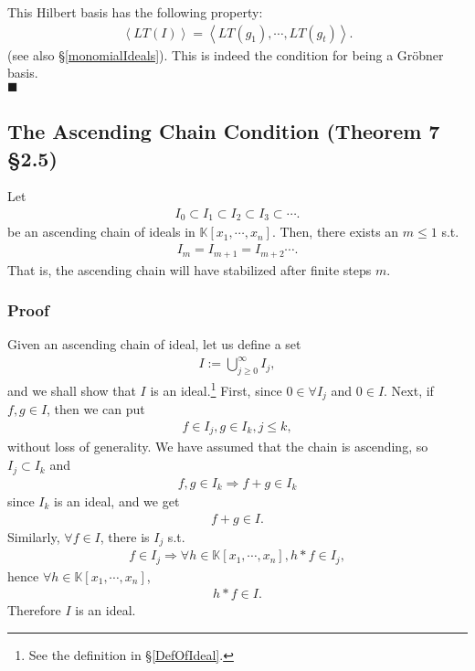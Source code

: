 \documentclass[11pt]{book}
\begin{document}
This Hilbert basis has the following property:
\begin{eqnarray}
\left< LT(I) \right> = \left< LT(g_1), \cdots, LT(g_t) \right>.
\end{eqnarray}
(see also \S\ref{monomialIdeals}).
This is indeed the condition for being a Gr\"obner basis.\\
$\blacksquare$

\subsection{The Ascending Chain Condition (Theorem 7 \S2.5)}
\label{ACC}
Let
\begin{eqnarray}
I_0 \subset I_1 \subset I_2 \subset I_3 \subset \cdots.
\end{eqnarray}
be an ascending chain of ideals in $\mathbb{K}[x_1, \cdots, x_n]$.
Then, there exists an $m \leq 1$ s.t.
\begin{eqnarray}
I_{m} = I_{m+1} = I_{m+2} \cdots.
\end{eqnarray}
That is, the ascending chain will have stabilized after finite steps $m$.

\subsubsection{Proof}
Given an ascending chain of ideal, let us define a set
\begin{eqnarray}
\label{BigI}
I := \bigcup_{j\geq 0}^\infty I_j,
\end{eqnarray}
and we shall show that $I$ is an ideal.\footnote{ See the definition in \S\ref{DefOfIdeal}.}
First, since $0 \in \forall I_j$ and $0\in I$.
Next, if $f,g \in I$, then we can put 
\begin{eqnarray}
f \in I_j, g \in I_k, j \leq k,
\end{eqnarray}
without loss of generality.
We have assumed that the chain is ascending, so $I_j \subset I_k$ and
\begin{eqnarray}
f,g \in I_k \Rightarrow f+g \in I_k
\end{eqnarray}
since $I_k$ is an ideal, and we get
\begin{eqnarray}
f+g \in I.
\end{eqnarray}
Similarly, $\forall f \in I$, there is $I_j$ s.t.
\begin{eqnarray}
f \in I_j \Rightarrow \forall h \in \mathbb{K}[x_1, \cdots, x_n], h*f \in I_j,
\end{eqnarray}
hence $\forall h \in \mathbb{K}[x_1, \cdots, x_n]$, 
\begin{eqnarray}
h*f \in I.
\end{eqnarray}
Therefore $I$ is an ideal.
\end{document}
